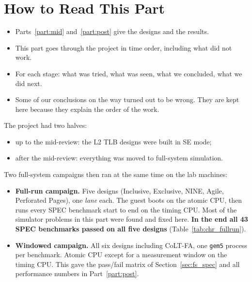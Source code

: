 
\section{How to Read This Part}
\label{sec:chr_intro}

\begin{itemize}
    \item Parts~\ref{part:mid} and~\ref{part:post} give the designs and the results.
    \item This part goes through the project in time order, including what did not work.
    \item For each stage: what was tried, what was seen, what we concluded, what we did next.
    \item Some of our conclusions on the way turned out to be wrong. They are kept here because they explain the order of the work.
\end{itemize}

The project had two halves:
\begin{itemize}
    \item up to the mid-review: the L2 TLB designs were built in SE mode;
    \item after the mid-review: everything was moved to full-system simulation.
\end{itemize}
Two full-system campaigns then ran at the same time on the lab machines:
\begin{itemize}
    \item \textbf{Full-run campaign.} Five designs (Inclusive, Exclusive, NINE, Agile, Perforated Pages), one \emph{lane} each. The guest boots on the atomic CPU, then runs every SPEC benchmark start to end on the timing CPU. Most of the simulator problems in this part were found and fixed here. \textbf{In the end all 43 SPEC benchmarks passed on all five designs} (Table~\ref{tab:chr_fullrun}).
    \item \textbf{Windowed campaign.} All six designs including CoLT-FA, one \texttt{gem5} process per benchmark. Atomic CPU except for a measurement window on the timing CPU. This gave the pass/fail matrix of Section~\ref{sec:fs_spec} and all performance numbers in Part~\ref{part:post}.
\end{itemize}

